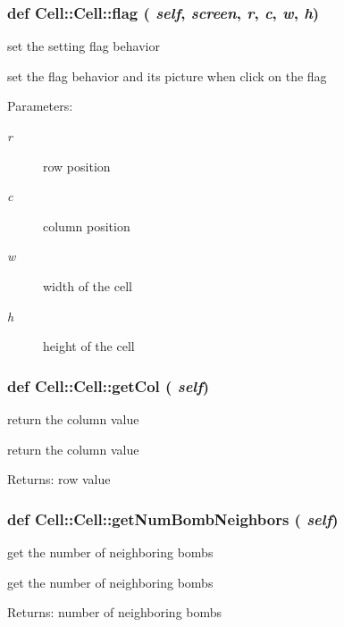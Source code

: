 \subsubsection{\setlength{\rightskip}{0pt plus 5cm}def Cell::Cell::flag ( {\em self},  {\em screen},  {\em r},  {\em c},  {\em w},  {\em h})}\label{classCell_1_1Cell_addc34fc7d4b845ccbfb51cc27585f4e}


set the setting flag behavior 

set the flag behavior and its picture when click on the flag \begin{Desc}
\item[Parameters:]
\begin{description}
\item[{\em r}]row position \item[{\em c}]column position \item[{\em w}]width of the cell \item[{\em h}]height of the cell \end{description}
\end{Desc}
\subsubsection{\setlength{\rightskip}{0pt plus 5cm}def Cell::Cell::get\-Col ( {\em self})}\label{classCell_1_1Cell_91fcb977d82b60a965eb4ace2c1e7c1e}


return the column value 

return the column value \begin{Desc}
\item[Returns:]row value \end{Desc}
\subsubsection{\setlength{\rightskip}{0pt plus 5cm}def Cell::Cell::get\-Num\-Bomb\-Neighbors ( {\em self})}\label{classCell_1_1Cell_da1dcf9c6cb04f217180003f15ebc6df}


get the number of neighboring bombs 

get the number of neighboring bombs \begin{Desc}
\item[Returns:]number of neighboring bombs \end{Desc}
